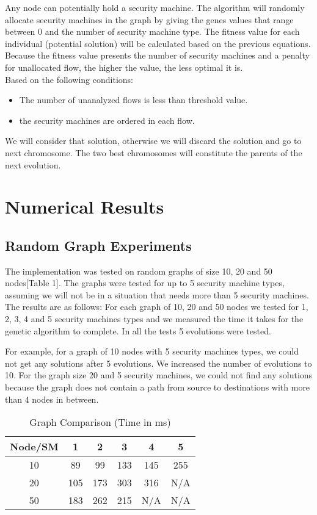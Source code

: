 \documentclass{article}
\begin{document}
 Any node can potentially hold a security machine. The algorithm will randomly allocate security machines in the graph by giving the genes values that range between 0 and the number of security machine type. The fitness value for each individual (potential solution) will be calculated based on the previous equations. Because the fitness value presents the number of security machines and a penalty for unallocated flow, the higher the value, the less optimal it is. \\
 Based on the following conditions:
 
 \begin{itemize}
 	\item The number of unanalyzed flows is less than threshold value.
 	\item the security machines are ordered in each flow.
 \end{itemize}


We will consider that solution, otherwise we will discard the solution and go to next chromosome. The two best chromosomes will constitute the parents of the next evolution.\\ \newline


\section{Numerical Results}
\subsection{Random Graph Experiments}
The implementation was tested on random graphs of size 10, 20 and 50 nodes[Table 1]. The graphs were tested for up to 5 security machine types, assuming we will not be in a situation that needs more than 5 security machines. The results are as follows: 
For each graph of 10, 20 and 50 nodes we tested for 1, 2, 3, 4 and 5 security machines types and we measured the time it takes for the genetic algorithm to complete. In all the tests 5 evolutions were tested. 

For example, for a graph of 10 nodes with 5 security machines types, we could not get any solutions after 5 evolutions. We increased the number of evolutions to 10. For the graph size 20 and 5 security machines, we could not find any solutions because the graph does not contain a path from source to destinations with more than 4 nodes in between.\\

\begin{table}
	\centering
	\begin{tabular}{|c|c|c|c|c|c|}\hline
		Node/SM & 1 & 2 & 3 & 4 & 5 \\\hline\hline
		10 & 89 & 99 & 133 & 145 & 255 \\
		20 & 105 & 173 & 303 & 316 & N/A \\
		50 & 183 & 262 & 215 & N/A & N/A \\\hline
	\end{tabular}
	
	\caption{Graph Comparison (Time in ms)}
	\label{table-sample}
\end{table}
\end{document}

